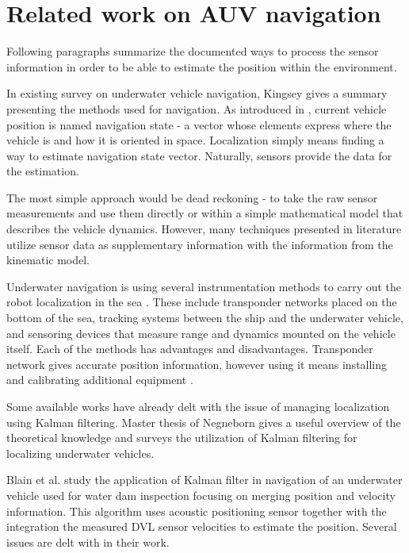 \section{Related work on AUV navigation}\label{sec:lit-review}

Following paragraphs summarize the documented ways to process the sensor information in order to be able to estimate the position within the environment.

In existing survey on underwater vehicle navigation, Kingsey \cite{kinsey06} gives a summary presenting the methods used for navigation. As introduced in \cite{kinsey06}, current vehicle position is named navigation state - a vector whose elements express where the vehicle is and how it is oriented in space. Localization simply means finding a way to estimate navigation state vector. Naturally, sensors provide the data for the estimation.

The most simple approach would be dead reckoning - to take the raw sensor measurements and use them directly or within a simple mathematical model that describes the vehicle dynamics. However, many techniques presented in literature utilize sensor data as supplementary information with the information from the kinematic model.

Underwater navigation is using several instrumentation methods to carry out the robot localization in the sea \cite{whitcomb99}. These include transponder networks placed on the bottom of the sea, tracking systems between the ship and the underwater vehicle, and sensoring devices that measure range and dynamics mounted on the vehicle itself. Each of the methods has advantages and disadvantages. Transponder network gives accurate position information, however using it means installing and calibrating additional equipment \cite{eustice05}.

Some available works have already delt with the issue of managing localization using Kalman filtering. Master thesis of Negneborn \cite{negenborn03} gives a useful overview of the theoretical knowledge and surveys the utilization of Kalman filtering for localizing underwater vehicles. 

Blain et al. \cite{blain03} study the application of Kalman filter in navigation of an underwater vehicle used for water dam inspection focusing on merging position and velocity information. This algorithm uses acoustic positioning sensor together with the integration the measured DVL sensor velocities \cite{blain03} to estimate the position. Several issues are delt with in their work. 

